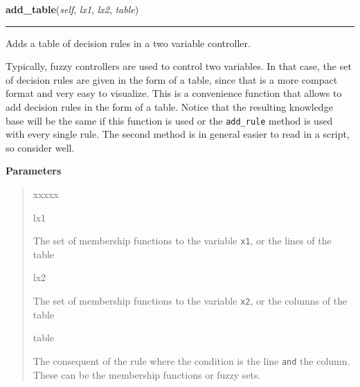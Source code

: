     \begin{boxedminipage}{\textwidth}

    \raggedright \textbf{add\_table}(\textit{self}, \textit{lx1}, \textit{lx2}, \textit{table})

    \vspace{-1.5ex}

    \rule{\textwidth}{0.5\fboxrule}

Adds a table of decision rules in a two variable controller.

Typically, fuzzy controllers are used to control two variables. In that
case, the set of decision rules are given in the form of a table, since
that is a more compact format and very easy to visualize. This is a
convenience function that allows to add decision rules in the form of a
table. Notice that the resulting knowledge base will be the same if this
function is used or the \texttt{add{\_}rule} method is used with every single
rule. The second method is in general easier to read in a script, so
consider well.
    \vspace{1ex}

      \textbf{Parameters}
      \begin{quote}
        \begin{Ventry}{xxxxx}

          \item[lx1]


The set of membership functions to the variable \texttt{x1}, or the
lines of the table
          \item[lx2]


The set of membership functions to the variable \texttt{x2}, or the
columns of the table
          \item[table]


The consequent of the rule where the condition is the line \texttt{and}
the column. These can be the membership functions or fuzzy sets.
        \end{Ventry}

      \end{quote}

    \vspace{1ex}

    \end{boxedminipage}

    \label{peach:fuzzy:control:Controller:eval}

